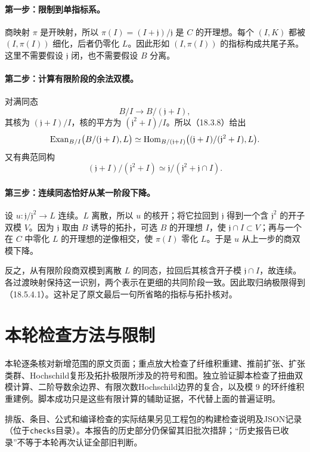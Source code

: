 \paragraph{第一步：限制到单指标系。}
商映射 $\pi$ 是开映射，所以 $\pi(I)=(I+\mathfrak j)/\mathfrak j$ 是 $C$ 的开理想。每个 $(I,K)$ 都被 $(I,\pi(I))$ 细化，后者仍零化 $L$。因此形如 $(I,\pi(I))$ 的指标构成共尾子系。这里不需要假设 $\mathfrak j$ 闭，也不需要假设 $B$ 分离。

\paragraph{第二步：计算有限阶段的余法双模。}
对满同态
\[
 B/I\longrightarrow B/(\mathfrak j+I),
\]
其核为 $(\mathfrak j+I)/I$，核的平方为 $(\mathfrak j^2+I)/I$。所以（18.3.8）给出
\[
 \operatorname{Exan}_{B/I}\bigl(B/(\mathfrak j+I),L\bigr)
 \simeq
 \operatorname{Hom}_{B/(\mathfrak j+I)}
 \bigl((\mathfrak j+I)/(\mathfrak j^2+I),L\bigr).
\]
又有典范同构
\[
 (\mathfrak j+I)/(\mathfrak j^2+I)
 \simeq \mathfrak j/(\mathfrak j^2+\mathfrak j\cap I).
\]

\paragraph{第三步：连续同态恰好从某一阶段下降。}
设 $u:\mathfrak j/\mathfrak j^2\to L$ 连续。$L$ 离散，所以 $u$ 的核开；将它拉回到 $\mathfrak j$ 得到一个含 $\mathfrak j^2$ 的开子双模 $V$。因为 $\mathfrak j$ 取由 $B$ 诱导的拓扑，可选 $B$ 的开理想 $I$，使 $\mathfrak j\cap I\subset V$；再与一个在 $C$ 中零化 $L$ 的开理想的逆像相交，使 $\pi(I)$ 零化 $L$。于是 $u$ 从上一步的商双模下降。

反之，从有限阶段商双模到离散 $L$ 的同态，拉回后其核含开子模 $\mathfrak j\cap I$，故连续。各过渡映射保持这一识别，两个表示在更细的共同阶段一致。因此取归纳极限得到（18.5.4.1）。这补足了原文最后一句所省略的指标与拓扑核对。

\section*{本轮检查方法与限制}
本轮逐条核对新增范围的原文页面；重点放大检查了纤维积重建、推前扩张、扩张类群、Hochschild复形及拓扑极限所涉及的符号和图。独立验证脚本检查了扭曲双模计算、二阶导数余边界、有限次数Hochschild边界的复合，以及模 $9$ 的环纤维积重建例。脚本成功只是这些有限计算的辅助证据，不代替上面的普遍证明。

排版、条目、公式和编译检查的实际结果另见工程包的构建检查说明及JSON记录（位于\texttt{checks}目录）。本报告的历史部分仍保留其旧批次措辞；“历史报告已收录”不等于本轮再次认证全部旧判断。
